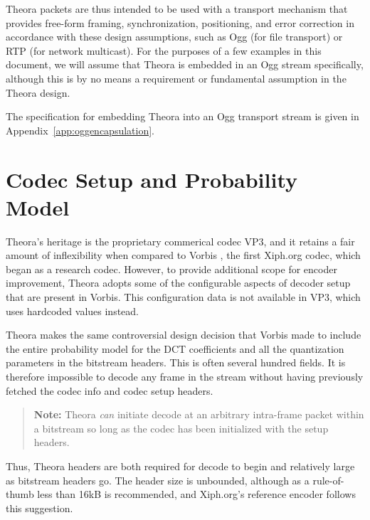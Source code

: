 \documentclass[11pt,letterpaper]{book}
\numberwithin{equation}{chapter}
\numberwithin{figure}{chapter}
\numberwithin{table}{chapter}
\begin{document}
Theora packets are thus intended to be used with a transport mechanism that
 provides free-form framing, synchronization, positioning, and error correction
 in accordance with these design assumptions, such as Ogg (for file transport)
 or RTP (for network multicast).
For the purposes of a few examples in this document, we will assume that Theora
 is embedded in an Ogg stream specifically, although this is by no means a
 requirement or fundamental assumption in the Theora design.

The specification for embedding Theora into an Ogg transport stream is given in
 Appendix~\ref{app:oggencapsulation}.

\section{Codec Setup and Probability Model}

Theora's heritage is the proprietary commerical codec VP3, and it retains a
 fair amount of inflexibility when compared to Vorbis \cite{vorbis}, the first
 Xiph.org codec, which began as a research codec.
However, to provide additional scope for encoder improvement, Theora adopts
 some of the configurable aspects of decoder setup that are present in Vorbis.
This configuration data is not available in VP3, which uses hardcoded values
 instead.

Theora makes the same controversial design decision that Vorbis made to include
 the entire probability model for the DCT coefficients and all the quantization
 parameters in the bitstream headers.
This is often several hundred fields.
It is therefore impossible to decode any frame in the stream without
 having previously fetched the codec info and codec setup headers.

\begin{verse}
{\bf Note:} Theora {\em can} initiate decode at an arbitrary intra-frame packet
 within a bitstream so long as the codec has been initialized with the setup
 headers.
\end{verse}

Thus, Theora headers are both required for decode to begin and relatively large
 as bitstream headers go.
The header size is unbounded, although as a rule-of-thumb less than 16kB is
 recommended, and Xiph.org's reference encoder follows this suggestion.
\end{document}
